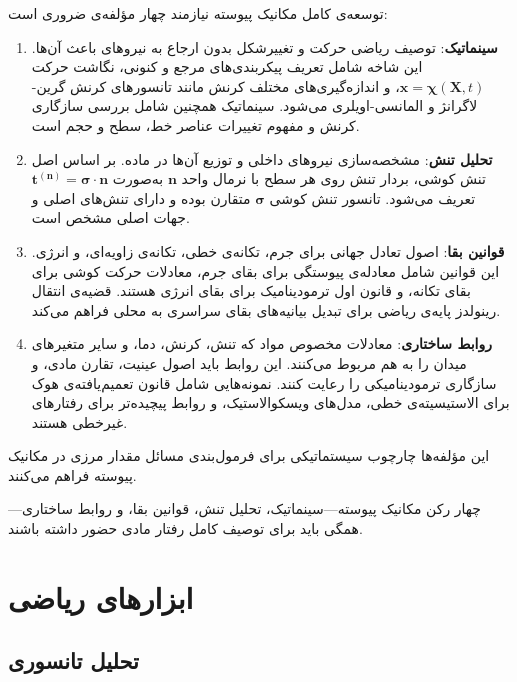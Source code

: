 توسعه‌ی کامل مکانیک پیوسته نیازمند چهار مؤلفه‌ی ضروری است:

\begin{enumerate}
	\item \textbf{سینماتیک}: توصیف ریاضی حرکت و تغییرشکل بدون ارجاع به نیروهای باعث آن‌ها. این شاخه شامل تعریف پیکربندی‌های مرجع و کنونی، نگاشت حرکت $\mathbf{x} = \boldsymbol{\chi}(\mathbf{X}, t)$، و اندازه‌گیری‌های مختلف کرنش مانند تانسورهای کرنش گرین-لاگرانژ و المانسی-اویلری می‌شود. سینماتیک همچنین شامل بررسی سازگاری کرنش و مفهوم تغییرات عناصر خط، سطح و حجم است.

	\item \textbf{تحلیل تنش}: مشخصه‌سازی نیروهای داخلی و توزیع آن‌ها در ماده. بر اساس اصل تنش کوشی، بردار تنش روی هر سطح با نرمال واحد $\mathbf{n}$ به‌صورت $\mathbf{t}^{(\mathbf{n})} = \boldsymbol{\sigma} \cdot \mathbf{n}$ تعریف می‌شود. تانسور تنش کوشی $\boldsymbol{\sigma}$ متقارن بوده و دارای تنش‌های اصلی و جهات اصلی مشخص است.

	\item \textbf{قوانین بقا}: اصول تعادل جهانی برای جرم، تکانه‌ی خطی، تکانه‌ی زاویه‌ای، و انرژی. این قوانین شامل معادله‌ی پیوستگی برای بقای جرم، معادلات حرکت کوشی برای بقای تکانه، و قانون اول ترمودینامیک برای بقای انرژی هستند. قضیه‌ی انتقال رینولدز پایه‌ی ریاضی برای تبدیل بیانیه‌های بقای سراسری به محلی فراهم می‌کند.

	\item \textbf{روابط ساختاری}: معادلات مخصوص مواد که تنش، کرنش، دما، و سایر متغیرهای میدان را به هم مربوط می‌کنند. این روابط باید اصول عینیت، تقارن مادی، و سازگاری ترمودینامیکی را رعایت کنند. نمونه‌هایی شامل قانون تعمیم‌یافته‌ی هوک برای الاستیسیته‌ی خطی، مدل‌های ویسکوالاستیک، و روابط پیچیده‌تر برای رفتارهای غیرخطی هستند.
\end{enumerate}

این مؤلفه‌ها چارچوب سیستماتیکی برای فرمول‌بندی مسائل مقدار مرزی در مکانیک پیوسته فراهم می‌کنند.

\begin{keypoint}
	چهار رکن مکانیک پیوسته—سینماتیک، تحلیل تنش، قوانین بقا، و روابط ساختاری—همگی باید برای توصیف کامل رفتار مادی حضور داشته باشند.
\end{keypoint}

\section{ابزارهای ریاضی}

\subsection{تحلیل تانسوری}

